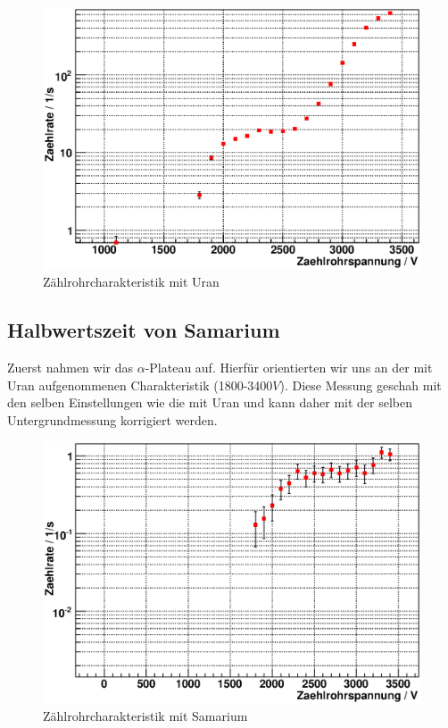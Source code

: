\documentclass[12pt]{article}
\begin{document}
\begin{figure}[H]  
\centering
\includegraphics[width=0.9\linewidth]{pictures/char_uran.eps}
\caption{Zählrohrcharakteristik mit Uran}
\end{figure}


\subsection{Halbwertszeit von Samarium}
Zuerst nahmen wir das $\alpha$-Plateau auf. Hierfür orientierten wir uns an der mit Uran aufgenommenen Charakteristik (1800-3400$V$).
Diese Messung geschah mit den selben Einstellungen wie die mit Uran und kann daher mit der selben Untergrundmessung korrigiert werden.

\begin{figure}[H]  
\centering
\includegraphics[width=0.9\linewidth]{pictures/char_sam.eps}
\caption{Zählrohrcharakteristik mit Samarium}
\end{figure}
\end{document}
